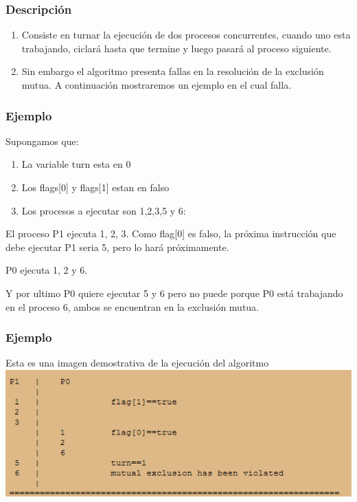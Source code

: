 \documentclass{beamer}
\begin{document}
\begin{frame}
\frametitle{Descripción} 
\begin{enumerate}[$*$]
\item Consiste en turnar la ejecución de dos procesos concurrentes, cuando uno esta trabajando, 
ciclará 
hasta que termine y luego pasará al proceso siguiente.
\item Sin embargo el algoritmo presenta fallas en la resolución de la exclusión mutua. A 
continuación 
mostraremos un ejemplo en el cual falla.
\end{enumerate}
\end{frame}


\begin{frame}
\frametitle{Ejemplo} 
Supongamos que:
\begin {enumerate}[$*$]
\item La variable turn esta en 0 
\item Los flags[0] y flags[1] estan en falso
\item Los procesos a ejecutar son 1,2,3,5 y 6:
\end{enumerate}
El proceso P1 ejecuta 1, 2, 3. Como flag[0] es falso, la próxima instrucción que debe ejecutar P1 
seria 5, pero lo hará próximamente.\par
P0 ejecuta 1, 2 y 6.\par
Y por ultimo P0 quiere ejecutar 5 y 6 pero no puede porque P0 está trabajando en el proceso 6, ambos 
se encuentran en la exclusión mutua.
\end{frame}

\begin{frame}
\frametitle{Ejemplo} 
Esta es una imagen demostrativa de la ejecución del algoritmo
\includegraphics[width=1\textwidth]{scenario.png}
\end{frame}
\end{document}
